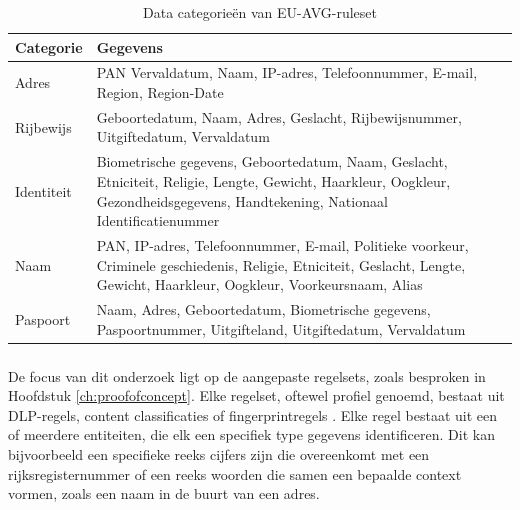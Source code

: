 \begin{table}[h]
    \centering
    \small
    \begin{tabular}{p{5cm}p{10cm}}
    \toprule
    \textbf{Categorie} & \textbf{Gegevens} \\
    \midrule
    Adres & PAN Vervaldatum, Naam, IP-adres, Telefoonnummer, E-mail, Region, Region-Date \\
    Rijbewijs & Geboortedatum, Naam, Adres, Geslacht, Rijbewijsnummer, Uitgiftedatum, Vervaldatum \\
    Identiteit & Biometrische gegevens, Geboortedatum, Naam, Geslacht, Etniciteit, Religie, Lengte, Gewicht, Haarkleur, Oogkleur, Gezondheidsgegevens, Handtekening, Nationaal Identificatienummer \\
    Naam & PAN, IP-adres, Telefoonnummer, E-mail, Politieke voorkeur, Criminele geschiedenis, Religie, Etniciteit, Geslacht, Lengte, Gewicht, Haarkleur, Oogkleur, Voorkeursnaam, Alias \\
    Paspoort & Naam, Adres, Geboortedatum, Biometrische gegevens, Paspoortnummer, Uitgifteland, Uitgiftedatum, Vervaldatum \\
    \bottomrule
    \end{tabular}
    \caption{Data categorieën van EU-AVG-ruleset \autocite{Netskope2023GDPR}}
    \label{tab:EU-AVG Netskope}
\end{table}

\subsubsection{}
\label{subsubsec:aangepaste-regels-literatuurstudie}

De focus van dit onderzoek ligt op de aangepaste regelsets, zoals besproken in Hoofdstuk \ref{ch:proofofconcept}. 
Elke regelset, oftewel profiel genoemd, bestaat uit DLP-regels, content classificaties of fingerprintregels \autocite{Netskope2025CreateProfiles}.
Elke regel bestaat uit een of meerdere entiteiten, die elk een specifiek type gegevens identificeren. 
Dit kan bijvoorbeeld een specifieke reeks cijfers zijn die overeenkomt met een rijksregisternummer of een reeks woorden die samen een bepaalde context vormen, zoals een naam in de buurt van een adres. 

\subsection{}
\label{subsec:entiteit-literatuurstudie}

